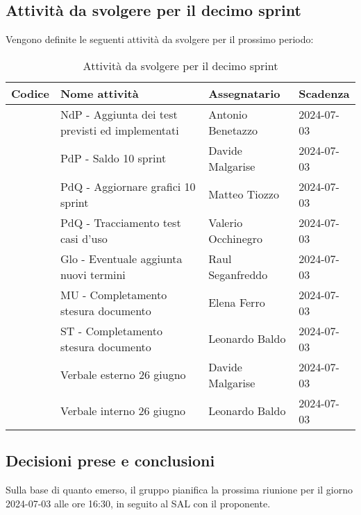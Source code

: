 \documentclass[italian,12pt]{article}
\begin{document}
\newpage

\subsection{Attività da svolgere per il decimo sprint}
Vengono definite le seguenti attività da svolgere per il prossimo periodo:
\begin{table}[!h]
	\centering
	\begin{tabular}{ |l||p{7cm}|l|l| }
		\hline
		\textbf{Codice}          & \textbf{Nome attività}                           & \textbf{Assegnatario} & \textbf{Scadenza} \\
		\hline
		\mySkip[86bz8e29k]       & NdP - Aggiunta dei test previsti ed implementati & Antonio Benetazzo     & 2024-07-03        \\
		\mySkip[86bz8e6dg]       & PdP - Saldo 10 sprint               				& Davide Malgarise      & 2024-07-03        \\
		\mySkip[86bz8e4c2]       & PdQ - Aggiornare grafici 10 sprint               & Matteo Tiozzo      	& 2024-07-03        \\
		\mySkip[86bz8e54v]       & PdQ - Tracciamento test casi d'uso               & Valerio Occhinegro    & 2024-07-03        \\
		\mySkip[86bz8e8hb]       & Glo - Eventuale aggiunta nuovi termini           & Raul Seganfreddo      & 2024-07-03        \\
		\mySkip[86bz8e2n7]       & MU - Completamento stesura documento     		& Elena Ferro           & 2024-07-03        \\
		\mySkip[86bz8e3y2]       & ST - Completamento stesura documento            	& Leonardo Baldo        & 2024-07-03        \\
		\mySkip[86bz9gkmf]       & Verbale esterno 26 giugno                        & Davide Malgarise      & 2024-07-03        \\
		\mySkip[86bz9gkth]       & Verbale interno 26 giugno                        & Leonardo Baldo        & 2024-07-03        \\
		\hline
	\end{tabular}
	\caption{Attività da svolgere per il decimo sprint}
\end{table}

\subsection{Decisioni prese e conclusioni}
Sulla base di quanto emerso, il gruppo pianifica la prossima riunione per il giorno 2024-07-03 alle ore 16:30,
in seguito al SAL con il proponente.
\end{document}
